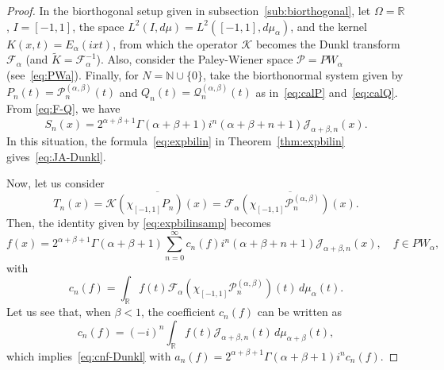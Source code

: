 \documentclass[11pt,a4paper]{amsart}
\theoremstyle{plain}
\theoremstyle{definition}
\newcommand{\N}{\mathbb{N}}
\newcommand{\R}{\mathbb{R}}
\newcommand{\calK}{\mathcal{K}}
\newcommand{\calF}{\mathcal{F}}
\newcommand{\calJ}{\mathcal{J}}
\newcommand{\calP}{\mathcal{P}}
\newcommand{\calQ}{\mathcal{Q}}
\begin{document}
\begin{proof}
In the biorthogonal setup given in subsection~\ref{sub:biorthogonal}, let 
$\Omega = \R$, $I = [-1,1]$,
the space $L^{2}(I,d\mu) = L^{2}([-1,1],d\mu_{\alpha})$,
and the kernel $K(x,t) = E_{\alpha}(ixt)$,
from which the operator $\calK$ becomes the Dunkl transform~$\calF_{\alpha}$
(and $\widetilde{K} = \calF_{\alpha}^{-1}$).
Also, consider the Paley-Wiener space $\calP = PW_{\alpha}$ (see~\eqref{eq:PWa}).
Finally, for $N= \N \cup \{0\}$, take the biorthonormal system given by
$P_{n}(t) = \calP_{n}^{(\alpha,\beta)}(t)$
and
$Q_{n}(t) = \calQ_{n}^{(\alpha,\beta)}(t)$ as in~\eqref{eq:calP}
and~\eqref{eq:calQ}.
From \eqref{eq:F-Q}, we have
\begin{equation*}
  S_{n}(x) = 2^{\alpha+\beta+1} \Gamma(\alpha+\beta+1) i^n
  (\alpha+\beta+n+1) \calJ_{\alpha+\beta,n}(x).
\end{equation*}
In this situation, the formula~\eqref{eq:expbilin} in Theorem~\ref{thm:expbilin}
gives~\eqref{eq:JA-Dunkl}.

Now, let us consider
\begin{equation*}
  T_n(x) = \overline{\calK(\chi_{[-1,1]}P_n)(x)}
  = \overline{\calF_{\alpha}(\chi_{[-1,1]} \calP^{(\alpha,\beta)}_n)(x)}.
\end{equation*}
Then, the identity given by \eqref{eq:expbilinsamp} becomes
\begin{equation*}
  f(x) = 2^{\alpha+\beta+1} \Gamma(\alpha+\beta+1)
  \sum_{n=0}^\infty c_n(f) i^n (\alpha+\beta+n+1)
  \calJ_{\alpha+\beta,n}(x),
  \quad f\in PW_{\alpha},
\end{equation*}
with
\begin{equation*}
  c_n(f) = \int_{\R} f(t) \calF_{\alpha}(\chi_{[-1,1]}
    \calP^{(\alpha,\beta)}_n)(t) \,d\mu_\alpha(t).
\end{equation*}
Let us see that, when $\beta<1$, the coefficient $c_n(f)$ can be written as
\begin{equation*}
  c_n(f) = (-i)^n \int_{\R} f(t) \calJ_{\alpha+\beta,n}(t)
  \,d\mu_{\alpha+\beta}(t),
\end{equation*}
which implies~\eqref{eq:cnf-Dunkl} with
$a_n(f) = 2^{\alpha+\beta+1} \Gamma(\alpha+\beta+1) i^n c_n(f)$.


\end{proof}
\end{document}
